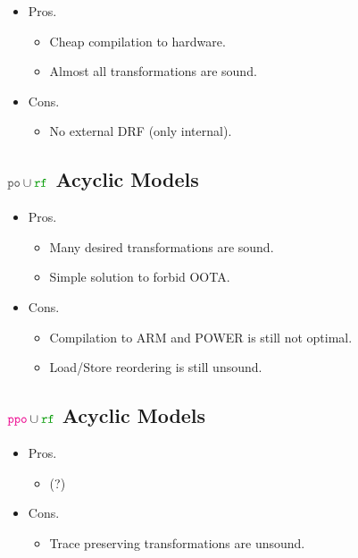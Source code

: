 \begin{itemize}
  \item Pros.
  \begin{itemize}
    \item Cheap compilation to hardware.
    \item Almost all transformations are sound. 
  \end{itemize}
  \item Cons.
  \begin{itemize}
    \item No external DRF (only internal).
  \end{itemize}
\end{itemize}

\subsection{$\lPO\cup\lRF$ Acyclic Models}

\begin{itemize}
  \item Pros.
  \begin{itemize}
    \item Many desired transformations are sound. 
    \item Simple solution to forbid OOTA.
  \end{itemize}
  \item Cons.
  \begin{itemize}
    \item Compilation to ARM and POWER is still not optimal.
    \item Load/Store reordering is still unsound.
  \end{itemize}
\end{itemize}

\subsection{$\lPPO\cup\lRF$ Acyclic Models}

\begin{itemize}
  \item Pros.
  \begin{itemize}
    \item (?)
  \end{itemize}
  \item Cons.
  \begin{itemize}
    \item Trace preserving transformations are unsound.
  \end{itemize}
\end{itemize}

